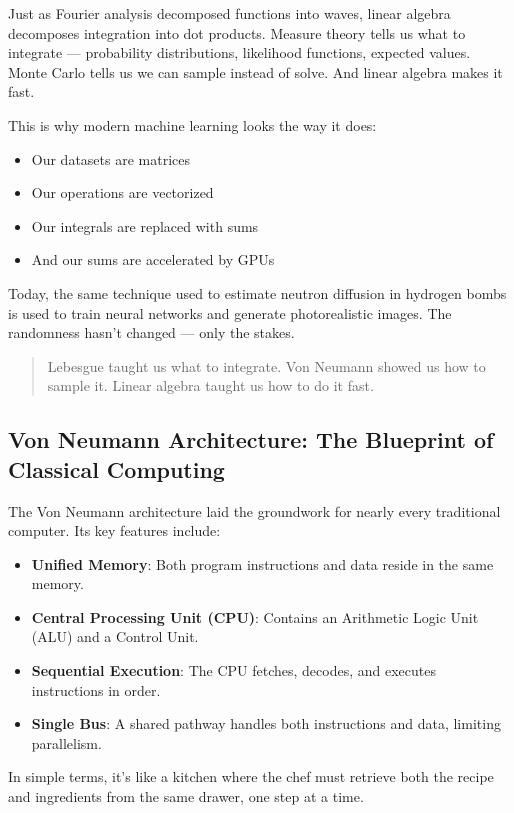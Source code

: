 Just as Fourier analysis decomposed functions into waves, linear algebra decomposes integration into dot products. Measure theory tells us what to integrate — probability distributions, likelihood functions, expected values. Monte Carlo tells us we can sample instead of solve. And linear algebra makes it fast.

This is why modern machine learning looks the way it does:
\begin{itemize}
  \item Our datasets are matrices
  \item Our operations are vectorized
  \item Our integrals are replaced with sums
  \item And our sums are accelerated by GPUs
\end{itemize}

Today, the same technique used to estimate neutron diffusion in hydrogen bombs is used to train neural networks and generate photorealistic images. The randomness hasn’t changed — only the stakes.

\begin{quote}
Lebesgue taught us what to integrate.  
Von Neumann showed us how to sample it.  
Linear algebra taught us how to do it fast.
\end{quote}


\subsection{Von Neumann Architecture: The Blueprint of Classical Computing}

The Von Neumann architecture laid the groundwork for nearly every traditional computer. Its key features include:

\begin{itemize}
    \item \textbf{Unified Memory}: Both program instructions and data reside in the same memory.
    \item \textbf{Central Processing Unit (CPU)}: Contains an Arithmetic Logic Unit (ALU) and a Control Unit.
    \item \textbf{Sequential Execution}: The CPU fetches, decodes, and executes instructions in order.
    \item \textbf{Single Bus}: A shared pathway handles both instructions and data, limiting parallelism.
\end{itemize}

In simple terms, it’s like a kitchen where the chef must retrieve both the recipe and ingredients from the same drawer, one step at a time.

